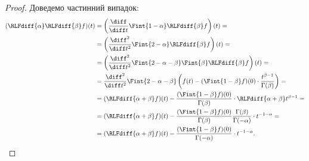 \begin{proof}
    Доведемо частинний випадок:
    \begin{equation}
        \begin{aligned}
            (\RLFdiff{\alpha} \RLFdiff{\beta} f)(t)
            &= \left( \frac{\diff}{\diff t} \Fint{1 - \alpha} \RLFdiff{\beta} f \right)(t) = \\
            &= \left( \frac{\diff^2}{\diff t^2} \Fint{2 - \alpha} \RLFdiff{\beta} f \right)(t) = \\
            &= \left( \frac{\diff^2}{\diff t^2} \Fint{2 - \alpha - \beta} \Fint{\beta} \RLFdiff{\beta} f \right)(t) = \\
            &= \frac{\diff^2}{\diff t^2} \Fint{2 - \alpha - \beta} \left( f(t) - (\Fint{1 - \beta} f)(0) \cdot \frac{t^{\beta - 1}}{\Gamma(\beta)} \right) = \\
            &= (\RLFdiff{\alpha + \beta} f)(t) - \frac{(\Fint{1 - \beta} f)(0)}{\Gamma(\beta)} \cdot \RLFdiff{\alpha + \beta} t^{\beta-1} = \\
            &= (\RLFdiff{\alpha + \beta} f)(t) - \frac{(\Fint{1 - \beta} f)(0)}{\Gamma(\beta)} \frac{\Gamma(\beta)}{\Gamma(-\alpha)} \cdot t^{-1 - \alpha} = \\
            &= (\RLFdiff{\alpha + \beta} f)(t) - \frac{(\Fint{1 - \beta} f)(0)}{\Gamma(-\alpha)} \cdot t^{-1 - \alpha}.
        \end{aligned}
    \end{equation}
\end{proof}

